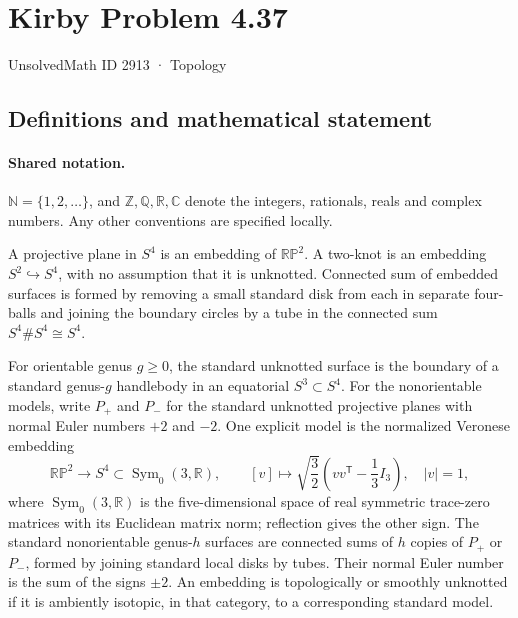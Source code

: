 \documentclass[11pt]{article}
\begin{document}
\setcounter{section}{2912}
\section{Kirby Problem 4.37}\label{2913}
{\small\sffamily UnsolvedMath ID 2913 · Topology}
\subsection{Definitions and mathematical statement}

\paragraph{Shared notation.}$\mathbb N=\{1,2,\ldots\}$, and $\mathbb Z,\mathbb Q,\mathbb R,\mathbb C$ denote the integers, rationals, reals and complex numbers. Any other conventions are specified locally.


A projective plane in $S^4$ is an embedding of $\mathbb{RP}^2$. A two-knot is an embedding $S^2\hookrightarrow S^4$, with no assumption that it is unknotted. Connected sum of embedded surfaces is formed by removing a small standard disk from each in separate four-balls and joining the boundary circles by a tube in the connected sum $S^4\#S^4\cong S^4$.

For orientable genus $g\ge0$, the standard unknotted surface is the boundary of a standard genus-$g$ handlebody in an equatorial $S^3\subset S^4$. For the nonorientable models, write $P_+$ and $P_-$ for the standard unknotted projective planes with normal Euler numbers $+2$ and $-2$. One explicit model is the normalized Veronese embedding
\[
\mathbb{RP}^2\longrightarrow S^4\subset\operatorname{Sym}_0(3,\mathbb R),\qquad
[v]\longmapsto\sqrt{\frac32}\left(vv^{\mathsf T}-\frac13I_3\right),\quad |v|=1,
\]
where $\operatorname{Sym}_0(3,\mathbb R)$ is the five-dimensional space of real symmetric trace-zero matrices with its Euclidean matrix norm; reflection gives the other sign. The standard nonorientable genus-$h$ surfaces are connected sums of $h$ copies of $P_+$ or $P_-$, formed by joining standard local disks by tubes. Their normal Euler number is the sum of the signs $\pm2$. An embedding is topologically or smoothly unknotted if it is ambiently isotopic, in that category, to a corresponding standard model.
\end{document}
